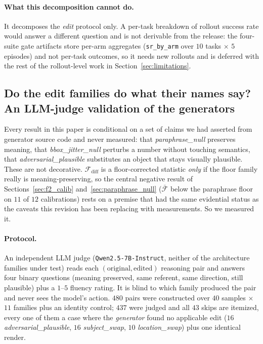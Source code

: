 \documentclass{article}
\begin{document}
\paragraph{What this decomposition cannot do.} It decomposes the \emph{edit} protocol only. A per-task breakdown of rollout success rate would answer a different question and is not derivable from the release: the four-suite gate artifacts store per-arm aggregates (\texttt{sr\_by\_arm} over $10$ tasks $\times$ $5$ episodes) and not per-task outcomes, so it needs new rollouts and is deferred with the rest of the rollout-level work in Section~\ref{sec:limitations}.

\subsection{Do the edit families do what their names say? An LLM-judge validation of the generators}
\label{sec:judge_edits}

Every result in this paper is conditional on a set of claims we had asserted from generator source code and never measured: that \emph{paraphrase\_null} preserves meaning, that \emph{bbox\_jitter\_null} perturbs a number without touching semantics, that \emph{adversarial\_plausible} substitutes an object that stays visually plausible. These are not decorative. $\mathcal{F}_{\text{diff}}$ is a floor-corrected statistic \emph{only} if the floor family really is meaning-preserving, so the central negative result of Sections~\ref{sec:f2_calib} and~\ref{sec:paraphrase_null} ($\bar{\mathcal{F}}$ below the paraphrase floor on $11$ of $12$ calibrations) rests on a premise that had the same evidential status as the caveats this revision has been replacing with measurements. So we measured it.

\paragraph{Protocol.} An independent LLM judge (\texttt{Qwen2.5-7B-Instruct}, neither of the architecture families under test) reads each $(\text{original}, \text{edited})$ reasoning pair and answers four binary questions (meaning preserved, same referent, same direction, still plausible) plus a $1$--$5$ fluency rating. It is blind to which family produced the pair and never sees the model's action. $480$ pairs were constructed over $40$ samples $\times$ $11$ families plus an identity control; $437$ were judged and all $43$ skips are itemized, every one of them a case where the \emph{generator} found no applicable edit ($16$ \emph{adversarial\_plausible}, $16$ \emph{subject\_swap}, $10$ \emph{location\_swap}) plus one identical render.
\end{document}
